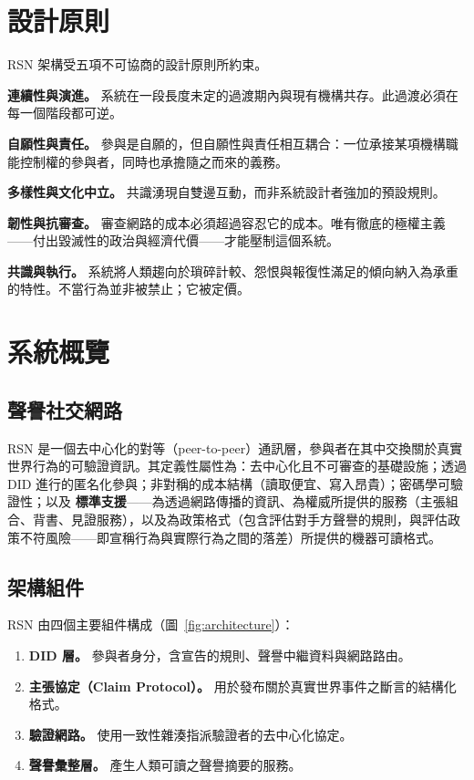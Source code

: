 \documentclass[11pt,a4paper,twocolumn]{article}
\begin{document}
\section{設計原則}

RSN 架構受五項不可協商的設計原則所約束。

\textbf{連續性與演進。} 系統在一段長度未定的過渡期內與現有機構共存。此過渡必須在每一個階段都可逆。

\textbf{自願性與責任。} 參與是自願的，但自願性與責任相互耦合：一位承接某項機構職能控制權的參與者，同時也承擔隨之而來的義務。

\textbf{多樣性與文化中立。} 共識湧現自雙邊互動，而非系統設計者強加的預設規則。

\textbf{韌性與抗審查。} 審查網路的成本必須超過容忍它的成本。唯有徹底的極權主義——付出毀滅性的政治與經濟代價——才能壓制這個系統。

\textbf{共識與執行。} 系統將人類趨向於瑣碎計較、怨恨與報復性滿足的傾向納入為承重的特性。不當行為並非被禁止；它被定價。

\section{系統概覽}

\subsection{聲譽社交網路}

RSN 是一個去中心化的對等（peer-to-peer）通訊層，參與者在其中交換關於真實世界行為的可驗證資訊。其定義性屬性為：去中心化且不可審查的基礎設施；透過 DID 進行的匿名化參與；非對稱的成本結構（讀取便宜、寫入昂貴）；密碼學可驗證性；以及 \textbf{標準支援}——為透過網路傳播的資訊、為權威所提供的服務（主張組合、背書、見證服務），以及為政策格式（包含評估對手方聲譽的規則，與評估政策不符風險——即宣稱行為與實際行為之間的落差）所提供的機器可讀格式。

\subsection{架構組件}

RSN 由四個主要組件構成（圖~\ref{fig:architecture}）：
\begin{enumerate}[nosep]
\item \textbf{DID 層。} 參與者身分，含宣告的規則、聲譽中繼資料與網路路由。
\item \textbf{主張協定（Claim Protocol）。} 用於發布關於真實世界事件之斷言的結構化格式。
\item \textbf{驗證網路。} 使用一致性雜湊指派驗證者的去中心化協定。
\item \textbf{聲譽彙整層。} 產生人類可讀之聲譽摘要的服務。
\end{enumerate}
\end{document}

